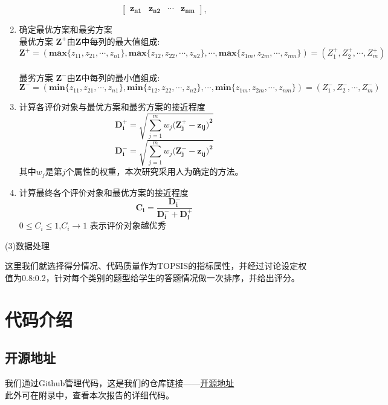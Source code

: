 \documentclass[UTF8]{ctexart}
\begin{document}
\begin{enumerate}
\begin{equation}
\begin{bmatrix}
		\bm{z_{n1}} & \bm{z_{n2}} & \cdots & \bm{z_{nm}}
		\end{bmatrix},
		\end{equation}
		\item 确定最优方案和最劣方案 \\
		最优方案 $\bm{Z^{+}}$由$\bm{Z}$中每列的最大值组成:
		\begin{equation}
		\bm{Z^{+}}=(\bm{max}\{z_{11},z_{21},\cdots,z_{n1}\},\bm{max}\{z_{12},z_{22},\cdots,z_{n2}\},\cdots,\bm{max}\{z_{1m},z_{2m},\cdots,z_{nm}\})
		=(Z_1^{+},Z_2^{+},\cdots,Z_m^{+})
		\end{equation}\\
		最劣方案 $\bm{Z^{-}}$由$\bm{Z}$中每列的最小值组成:
		\begin{equation}
		\bm{Z^{-}}=(\bm{min}\{z_{11},z_{21},\cdots,z_{n1}\},\bm{min}\{z_{12},z_{22},\cdots,z_{n2}\},\cdots,\bm{min}\{z_{1m},z_{2m},\cdots,z_{nm}\})=(Z_1^{-},Z_2^{-},\cdots,Z_m^{-})
		\end{equation}
		\item 计算各评价对象与最优方案和最劣方案的接近程度
		\begin{equation}
		\bm{D_i^{+}}=\sqrt{\sum_{j=1}^m {w_j(\bm{Z_j^{+}-z_{ij})^2}}}
		\end{equation}
		\begin{equation}
		\bm{D_i^{-}}=\sqrt{\sum_{j=1}^m {w_j(\bm{Z_j^{-}-z_{ij})^2}}}
		\end{equation}
		其中$w_j$是第$j$个属性的权重，本次研究采用人为确定的方法。
		\item 计算最终各个评价对象和最优方案的接近程度
		\begin{equation}
		\bm{C_i}=\frac{\bm{D_i^{-}}}{\bm{D_i^{-}}+\bm{D_i^{+}}}
		\end{equation}
		$0 \leq C_i \leq 1$,$C_i \rightarrow 1$ 表示评价对象越优秀
	\end{enumerate}
	\par (3)数据处理
	\par 这里我们就选择得分情况、代码质量作为TOPSIS的指标属性，并经过讨论设定权值为0.8:0.2，针对每个类别的题型给学生的答题情况做一次排序，并给出评分。
	\section{代码介绍}\label{sec3}
	\subsection{开源地址}
	我们通过Github管理代码，这是我们的仓库链接——\href{https://github.com/Coolingsky167/DataScienceHomework}{开源地址}\\
	此外可在附录中，查看本次报告的详细代码。
\end{document}
